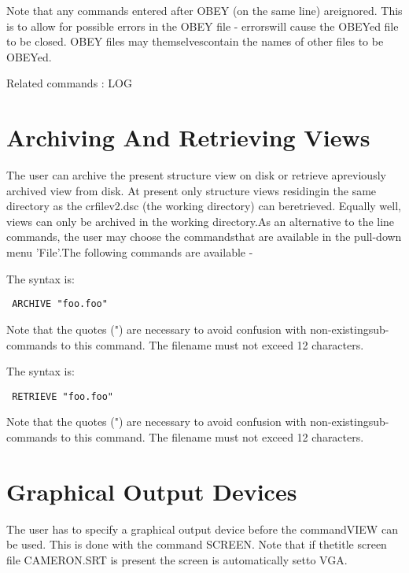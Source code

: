 \documentclass[10pt,a4paper]{report}
\begin{document}
Note that any commands entered after OBEY (on the same line) areignored. This is to allow for possible errors in the OBEY file - errorswill cause the OBEYed file to be closed. OBEY files may themselvescontain the names of other files to be OBEYed.



Related commands : LOG\chapter{Archiving And Retrieving Views}

The user can archive the present structure view on disk or retrieve apreviously archived view from disk. At present only structure views residingin the same directory as the crfilev2.dsc (the working directory) can beretrieved. Equally well, views can only be archived in the working directory.As an alternative to the line commands, the user may choose the commandsthat are available in the pull-down menu 'File'.The following commands are available -

\bigskip{}



The syntax is:\small\begin{verbatim} ARCHIVE "foo.foo"\end{verbatim}\normalsize



Note that the quotes (") are necessary to avoid confusion with non-existingsub-commands to this command. The filename must not exceed 12 characters.



\bigskip{}



The syntax is:\small\begin{verbatim} RETRIEVE "foo.foo"\end{verbatim}\normalsize



Note that the quotes (") are necessary to avoid confusion with non-existingsub-commands to this command. The filename must not exceed 12 characters.\chapter{Graphical Output Devices}

The user has to specify a graphical output device before the commandVIEW can be used. This is done with the command SCREEN. Note that if thetitle screen file CAMERON.SRT is present the screen is automatically setto VGA.
\end{document}
